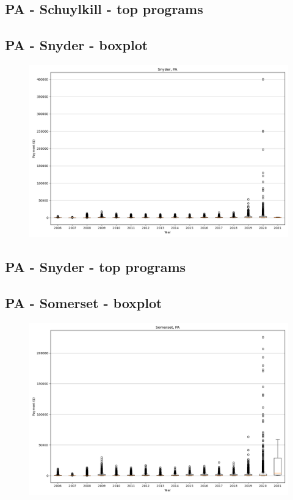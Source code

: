 \subsection*{PA - Schuylkill - top programs}

\newpage
\subsection*{PA - Snyder - boxplot}
\begin{figure}[h]
\centering
\includegraphics[width=7in]{../output/boxplots/counties/Snyder-PA_boxplot.png}
\end{figure}


\subsection*{PA - Snyder - top programs}

\newpage
\subsection*{PA - Somerset - boxplot}
\begin{figure}[h]
\centering
\includegraphics[width=7in]{../output/boxplots/counties/Somerset-PA_boxplot.png}
\end{figure}


